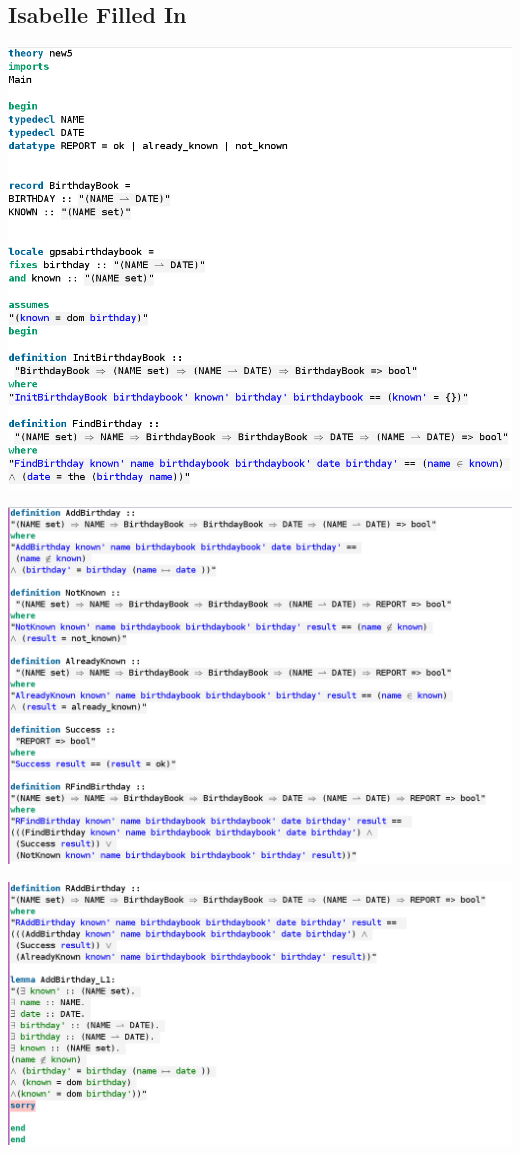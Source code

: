 \subsection{Isabelle Filled In}
\label{app:bb5}
\includegraphics[scale=0.4]{examples/bb/5imagea.png}

\noindent \includegraphics[scale=0.4]{examples/bb/5imageb.png}

\noindent \includegraphics[scale=0.4]{examples/bb/5imagec.png}
%
%
